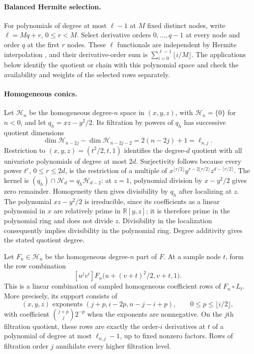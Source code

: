 \documentclass[11pt]{amsart}
\theoremstyle{definition}
\theoremstyle{remark}
\numberwithin{equation}{section}
\begin{document}
\paragraph{Balanced Hermite selection.}\label{reg:balanced-hermite}
For polynomials of degree at most $\ell-1$ at $M$ fixed distinct nodes, write $\ell=Mq+r$, $0\le r<M$. Select derivative orders $0,\ldots,q-1$ at every node and order $q$ at the first $r$ nodes. These $\ell$ functionals are independent by Hermite interpolation \cite[Proposition 7]{deBoor}, and their derivative-order sum is $\sum_{i=0}^{\ell-1}\lfloor i/M\rfloor$. The applications below identify the quotient or chain with this polynomial space and check the availability and weights of the selected rows separately.

\paragraph{Homogeneous conics.}
Let $\mathcal H_n$ be the homogeneous degree-$n$ space in $(x,y,z)$, with $\mathcal H_n=\{0\}$ for $n<0$, and let $q_h=xz-y^2/2$. Its filtration by powers of $q_h$ has successive quotient dimensions
\[
 \dim \mathcal H_{n-2j}-\dim\mathcal H_{n-2j-2}=2(n-2j)+1=\ell_{n,j}.
\]
Restriction to $(x,y,z)=(t^2/2,t,1)$ identifies the degree-$d$ quotient with all univariate polynomials of degree at most $2d$. Surjectivity follows because every power $t^r$, $0\le r\le2d$, is the restriction of a multiple of $x^{\lfloor r/2\rfloor}y^{r-2\lfloor r/2\rfloor}z^{d-\lceil r/2\rceil}$. The kernel is $(q_h)\cap\mathcal H_d=q_h\mathcal H_{d-2}$: at $z=1$, polynomial division by $x-y^2/2$ gives zero remainder. Homogeneity then gives divisibility by $q_h$ after localizing at $z$. The polynomial $xz-y^2/2$ is irreducible, since its coefficients as a linear polynomial in $x$ are relatively prime in $\mathbb R[y,z]$; it is therefore prime in the polynomial ring and does not divide $z$. Divisibility in the localization consequently implies divisibility in the polynomial ring. Degree additivity gives the stated quotient degree.

Let $F_n\in\mathcal H_n$ be the homogeneous degree-$n$ part of $F$. At a sample node $t$, form the row combination
\begin{equation}\label{reg:eq:virtual-h}
 [u^jv^i]F_n\bigl(u+(v+t)^2/2,v+t,1\bigr).
\end{equation}
This is a linear combination of sampled homogeneous coefficient rows of $F_n\circ L_t$. More precisely, its support consists of
\begin{equation}\label{reg:eq:rows-h}
 (x,y,z)\text{ exponents }(j+p,i-2p,n-j-i+p),\qquad 0\le p\le\lfloor i/2\rfloor,
\end{equation}
with coefficient $\binom{j+p}{j}2^{-p}$ when the exponents are nonnegative. On the $j$th filtration quotient, these rows are exactly the order-$i$ derivatives at $t$ of a polynomial of degree at most $\ell_{n,j}-1$, up to fixed nonzero factors. Rows of filtration order $j$ annihilate every higher filtration level.
\end{document}
